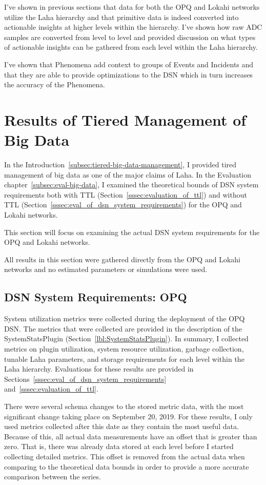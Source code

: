 I've shown in previous sections that data for both the OPQ and Lokahi networks utilize the Laha hierarchy and that primitive data is indeed converted into actionable insights at higher levels within the hierarchy. I've shown how raw ADC samples are converted from level to level and provided discussion on what types of actionable insights can be gathered from each level within the Laha hierarchy.

I've shown that Phenomena add context to groups of Events and Incidents and that they are able to provide optimizations to the DSN which in turn increases the accuracy of the Phenomena.

\section{Results of Tiered Management of Big Data}\label{sec:dsn-system-requirements}

In the Introduction~\ref{subsec:tiered-big-data-management}, I provided tired management of big data as one of the major claims of Laha. In the Evaluation chapter~\ref{subsec:eval-big-data}, I examined the theoretical bounds of DSN system requirements both with TTL (Section~\ref{sssec:evaluation_of_ttl}) and without TTL (Section~\ref{sssec:eval_of_dsn_system_requirements}) for the OPQ and Lokahi networks.

This section will focus on examining the actual DSN system requirements for the OPQ and Lokahi networks.

All results in this section were gathered directly from the OPQ and Lokahi networks and no estimated parameters or simulations were used.

\subsection{DSN System Requirements: OPQ}\label{subsec:dsn-system-requirements:-opq}

System utilization metrics were collected during the deployment of the OPQ DSN. The metrics that were collected are provided in the description of the SystemStatsPlugin (Section~\ref{lbl:SystemStatsPlugin}). In summary, I collected metrics on plugin utilization, system resource utilization, garbage collection, tunable Laha parameters, and storage requirements for each level within the Laha hierarchy. Evaluations for these results are provided in Sections~\ref{sssec:eval_of_dsn_system_requirements} and~\ref{sssec:evaluation_of_ttl}.

There were several schema changes to the stored metric data, with the most significant change taking place on September 20, 2019. For these results, I only used metrics collected after this date as they contain the most useful data. Because of this, all actual data measurements have an offset that is greater than zero. That is, there was already data stored at each level before I started collecting detailed metrics. This offset is removed from the actual data when comparing to the theoretical data bounds in order to provide a more accurate comparison between the series.

